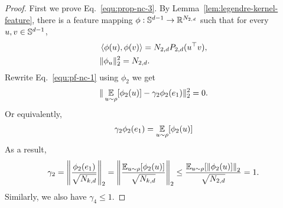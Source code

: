 \begin{proof}
First we prove Eq.~\eqref{equ:prop-nc-3}. By Lemma~\ref{lem:legendre-kernel-feature}, there is a feature mapping $\phi:\mathbb{S}^{d-1}\to\mathbb{R}^{N_{2,d}}$ such that for every $u,v\in\mathbb{S}^{d-1}$,
\begin{align}
    &\left<\phi(u), \phi(v)\right>=N_{2,d}P_{2,d}(u^\top v),\\
    &\|\phi_u\|_2^2=N_{2,d}.
\end{align}
Rewrite Eq.~\eqref{equ:pf-nc-1} using $\phi_2$ we get
\begin{align}
    \|\operatorname*{\mathbb{E}}_{u \sim \rho} [\phi_2(u)] - \gamma_2 \phi_2(e_1)\|_2^2=0.
\end{align}
Or equivalently,
\begin{align}
    \gamma_2\phi_2(e_1)=\operatorname*{\mathbb{E}}_{u \sim \rho} [\phi_2(u)]
\end{align}
As a result,
\begin{align}
    \gamma_2=\left\lVert\frac{\phi_2(e_1)}{\sqrt{N_{k,d}}}\right\rVert_2=\left\lVert\frac{\operatorname*{\mathbb{E}}_{u \sim \rho} [\phi_2(u)]}{\sqrt{N_{k,d}}}\right\rVert_2\le \frac{\operatorname*{\mathbb{E}}_{u \sim \rho} [\left\lVert\phi_2(u)]\right\rVert_2}{\sqrt{N_{2,d}}}=1.
\end{align}
Similarly, we also have $\gamma_4\le 1.$


\end{proof}
